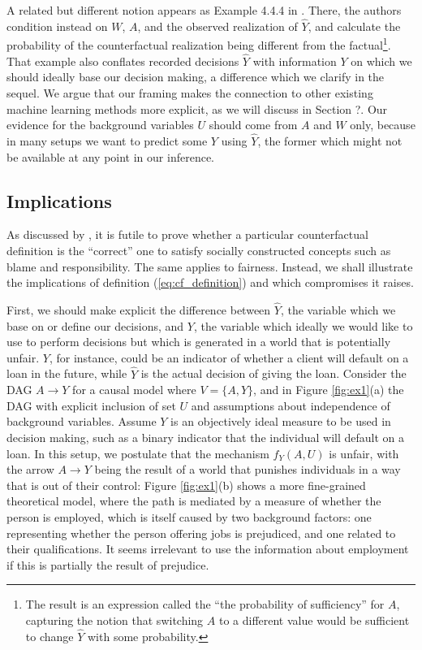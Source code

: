 A related but different notion appears as Example 4.4.4 in
\citet{pearl:16}. There, the authors condition instead on $W$, $A$,
and the observed realization of $\hat Y$, and calculate the
probability of the counterfactual realization being different from the
factual\footnote{The result is an expression called the ``the
  probability of sufficiency'' for $A$, capturing the notion that
  switching $A$ to a different value would be sufficient to change
  $\hat Y$ with some probability.}. That example also conflates
recorded decisions $\hat Y$ with information $Y$ on which we should ideally
base our decision making, a difference which we clarify in the
sequel. We argue that our framing makes the connection to other
existing machine learning methods more explicit, as we will discuss in
Section ?. Our evidence for the background variables $U$ should come from
$A$ and $W$ only, because in many setups we want to predict some $Y$
using $\hat Y$, the former which might not be available at any point
in our inference.

\subsection{Implications}
%
As discussed by \cite{halpern:16}, it is futile to prove whether a
particular counterfactual definition is the ``correct'' one to satisfy
socially constructed concepts such as blame and responsibility. The
same applies to fairness. Instead, we shall illustrate the
implications of definition (\ref{eq:cf_definition}) and which
compromises it raises.

First, we should make explicit the difference between $\hat Y$, the
variable which we base on or define our decisions, and $Y$, the variable which
ideally we would like to use to perform decisions but which is
generated in a world that is potentially unfair. $Y$, for instance,
could be an indicator of whether a client will default on a loan in
the future, while $\hat Y$ is the actual decision of giving the
loan. Consider the DAG $A \rightarrow Y$ for a causal model where $V =
\{A, Y\}$, and in Figure \ref{fig:ex1}(a) the DAG with explicit
inclusion of set $U$ and assumptions about independence of background
variables. Assume $Y$ is an objectively ideal measure to be used in
decision making, such as a binary indicator that the individual will
default on a loan. In this setup, we postulate that the mechanism
$f_Y(A, U)$ is unfair, with the arrow $A \rightarrow Y$ being the
result of a world that punishes individuals in a way that is out of
their control: Figure \ref{fig:ex1}(b) shows a more fine-grained
theoretical model, where the path is mediated by a measure of
whether the person is employed, which is itself caused by
two background factors: one representing whether the person offering jobs is
prejudiced, and one related to their qualifications. It seems irrelevant
to use the information about employment if this is partially the result
of prejudice.

